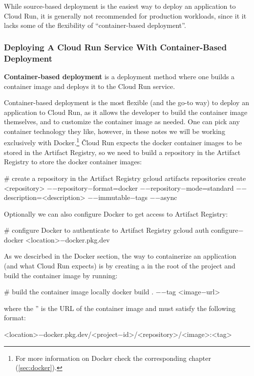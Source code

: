 While source-based deployment is the easiest way to deploy an application to Cloud Run, it is generally not recommended
for production workloads, since it it lacks some of the flexibility of ``container-based deployment''.

\subsubsection{Deploying A Cloud Run Service With Container-Based Deployment}

\textbf{Container-based deployment} is a deployment method where one builds a container image and deploys it to the
Cloud Run service.
\ed

Container-based deployment is the most flexible (and the go-to way) to deploy an application to Cloud Run, as it allows
the developer to build the container image themselves, and to customize the container image as needed. One can pick any
container technology they like, however, in these notes we will be working exclusively with Docker.\footnote{For more
information on Docker check the corresponding chapter (\ref{sec:docker}).} \v

Cloud Run expects the docker container images to be stored in the Artifact Registry, so we need to build a repository
in the Artifact Registry to store the docker container images:
\begin{bash}
# create a repository in the Artifact Registry
gcloud artifacts repositories create <repository>
    $-$$-$repository$-$format=docker
    $-$$-$repository$-$mode=standard
    $-$$-$description=<description>
    $-$$-$immutable$-$tags
    $-$$-$async
\end{bash}

Optionally we can also configure Docker to get access to Artifact Registry:
\begin{bash}
# configure Docker to authenticate to Artifact Registry
gcloud auth configure$-$docker <location>$-$docker.pkg.dev
\end{bash}

As we descirbed in the Docker section, the way to containerize an application (and what Cloud Run expects) is by
creating a  in the root of the project and build the container image by running:
\begin{bash}
# build the container image locally
docker build . $-$$-$tag <image$-$url>
\end{bash}

where the '' is the URL of the container image and must satisfy the following format:
\begin{block}
<location>$-$docker.pkg.dev/<project$-$id>/<repository>/<image>:<tag>
\end{block}

